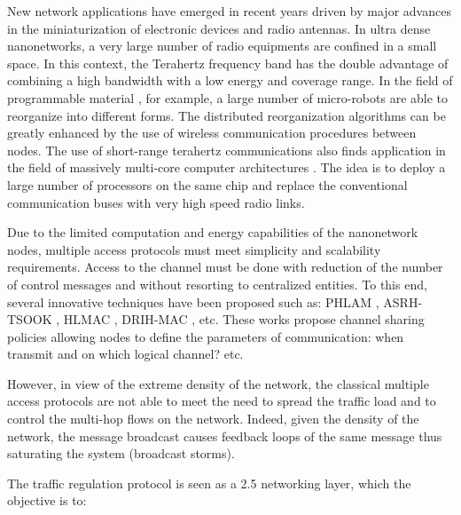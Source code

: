\documentclass[letterpaper, 10 pt, conference]{ieeeconf}
\begin{document}
New network applications have emerged in recent years driven by major advances in the miniaturization of electronic devices and radio antennas. In ultra dense nanonetworks, a very large number of radio equipments are confined in a small space. In this context, the Terahertz frequency band has the double advantage of combining a high bandwidth with a low energy and coverage range. In the field of programmable material \cite{progmatter}, for example, a large number of micro-robots are able to reorganize into different forms. The distributed reorganization algorithms can be greatly enhanced by the use of wireless communication procedures between nodes. The use of short-range terahertz communications also finds application in the field of massively multi-core computer architectures \cite{abadal}. The idea is to deploy a large number of processors on the same chip and replace the conventional communication buses with very high speed radio links. 

Due to the limited computation and energy capabilities of the nanonetwork nodes, multiple access protocols must meet simplicity and scalability requirements. Access to the channel must be done with reduction of the number of control messages and without resorting to centralized entities. To this end, several innovative techniques have been proposed such as: PHLAM \cite{phlame}, ASRH-TSOOK \cite{asrhtsook}, HLMAC \cite{HLMAC}, DRIH-MAC \cite{DRIH-MAC}, etc. These works propose channel sharing policies allowing nodes to define the parameters of communication: when transmit and on which logical channel? etc.

However, in view of the extreme density of the network, the classical multiple access protocols are not able to meet the need to spread the traffic load and to control the multi-hop flows on the network. Indeed, given the density of the network, the message broadcast causes feedback loops of the same message thus saturating the system (broadcast storms). 

The traffic regulation protocol is seen as a 2.5 networking layer, which the objective is to:
  
\end{document}
